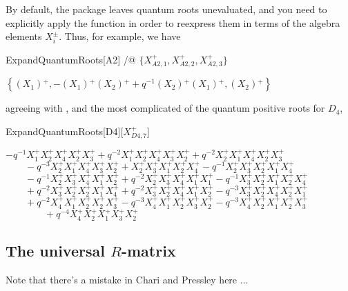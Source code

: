By default, the  package leaves quantum roots unevaluated, and you need to explicitly apply the function 
in order to reexpress them in terms of the algebra elements $X_i^\pm$. Thus, for example, we have
\begin{mma}
\begin{inm}ExpandQuantumRoots[A2] /@ $\{ X_{A2,1}^+, X_{A2,2}^+, X_{A2,3}^+ \}$
\end{inm}
\begin{outm}$\left\{\left(X_1\right){}^+,-\left(X_1\right){}^+\left(X_2\right){}^+ + q^{-1}\left(X_2\right){}^+\left(X_1\right){}^+,\left(X_2\right){}^+\right\}$
\end{outm}
\end{mma}
agreeing with \cite[Example 8.1.5]{CP}, and the most complicated of the quantum positive roots for $D_4$,
\begin{mma}
\begin{inm}ExpandQuantumRoots[D4][$X_{D4,7}^+$]
\end{inm}
\begin{outm}$-q^{-1}X_1^+ X_2^+ X_4^+ X_2^+ X_3^+ + q^{-2}X_1^+ X_2^+ X_4^+ X_3^+ X_2^+ + q^{-2}X_2^+ X_1^+ X_4^+ X_2^+ X_3^+$
$\qquad  -q^{-3}X_2^+ X_1^+ X_4^+ X_3^+ X_2^+ +X_2^+ X_3^+ X_1^+ X_2^+ X_4^+ - q^{-1}X_2^+ X_3^+ X_2^+ X_1^+ X_4^+$
$\qquad  - q^{-1}X_2^+ X_3^+ X_4^+ X_1^+ X_2^+ + q^{-2}X_2^+ X_3^+ X_4^+ X_1^+ X_1^+ -q^{-1}X_3^+ X_2^+ X_1^+ X_2^+ X_4^+$
$\qquad + q^{-2}X_3^+ X_2^+ X_2^+ X_1^+ X_4^+ + q^{-2}X_3^+ X_2^+ X_4^+ X_1^+ X_2^+ -q^{-3}X_3^+ X_2^+ X_4^+ X_2^+ X_1^+$
$\qquad +q^{-2}X_4^+ X_1^+ X_2^+ X_2^+ X_3^+ - q^{-3}X_4^+ X_1^+ X_2^+ X_3^+ X_2^+ - q^{-3}X_4^+ X_2^+ X_1^+ X_2^+ X_3^+$
$\qquad \qquad + q^{-4}X_4^+ X_2^+ X_1^+ X_3^+ X_2^+$
\end{outm}
\end{mma}

\subsection{The universal $R$-matrix}

Note that there's a mistake in Chari and Pressley here ...

\subsection{}
